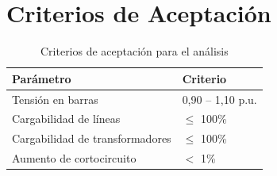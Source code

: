 \section{Criterios de Aceptación}

\begin{table}[H]
    \centering
    \caption{Criterios de aceptación para el análisis}
    \begin{tabular}{ll}
    \toprule
    \textbf{Parámetro} & \textbf{Criterio} \\
    \midrule
    Tensión en barras & 0,90 -- 1,10 p.u. \\
    Cargabilidad de líneas & $\leq$ 100\% \\
    Cargabilidad de transformadores & $\leq$ 100\% \\
    Aumento de cortocircuito & $<$ 1\% \\
    \bottomrule
    \end{tabular}
\end{table}
